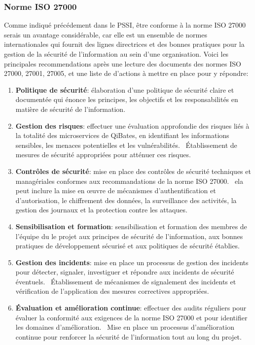\documentclass[a4paper, 11pt]{report}
\begin{document}
  \subsubsection{Norme ISO 27000}
  Comme indiqué précédement dans le PSSI, être conforme à la norme ISO 27000 serais un avantage considérable, car elle est un ensemble de normes internationales qui fournit des lignes directrices et des bonnes pratiques pour la gestion de la sécurité de l'information au sein d'une organisation.
  Voici les principales recommendations après une lecture des documents des normes ISO 27000, 27001, 27005, et une liste de d'actions à mettre en place pour y répondre:
  \begin{enumerate}
    \item \textbf{Politique de sécurité}: élaboration d'une politique de sécurité claire et documentée qui énonce les principes, les objectifs et les responsabilités en matière de sécurité de l'information.
    \item \textbf{Gestion des risques}: effectuer une évaluation approfondie des risques liés à la totalité des microservices de QiBates, en identifiant les informations sensibles, les menaces potentielles et les vulnérabilités.
      \ Établissement de mesures de sécurité appropriées pour atténuer ces risques.
    \item \textbf{Contrôles de sécurité}: mise en place des contrôles de sécurité techniques et managériales conformes aux recommandations de la norme ISO 27000.
      \ ela peut inclure la mise en œuvre de mécanismes d'authentification et d'autorisation, le chiffrement des données, la surveillance des activités, la gestion des journaux et la protection contre les attaques.
    \item \textbf{Sensibilisation et formation}: sensibilisation et formation des membres de l'équipe du le projet aux principes de sécurité de l'information, aux bonnes pratiques de développement sécurisé et aux politiques de sécurité établies.
    \item \textbf{Gestion des incidents}: mise en place un processus de gestion des incidents pour détecter, signaler, investiguer et répondre aux incidents de sécurité éventuels.
      \ Établissement de mécanismes de signalement des incidents et vérification de l'application des mesures correctives appropriées.
    \item \textbf{Évaluation et amélioration continue}: effectuer des audits réguliers pour évaluer la conformité aux exigences de la norme ISO 27000 et pour identifier les domaines d'amélioration.
      \ Mise en place un processus d'amélioration continue pour renforcer la sécurité de l'information tout au long du projet.
  \end{enumerate}
\end{document}
